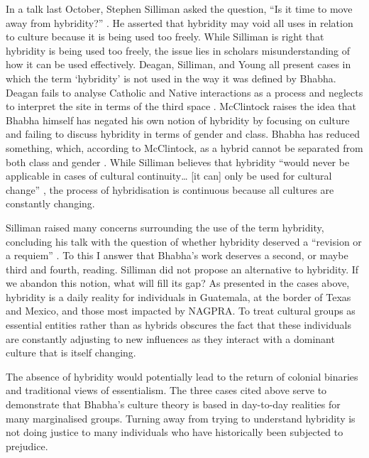 	In a talk last October, Stephen Silliman asked the question, “Is it time to move away from hybridity?” \parencite{Silliman_2014}. He asserted that hybridity may void all uses in relation to culture because it is being used too freely. While Silliman is right that hybridity is being used too freely, the issue lies in scholars misunderstanding of how it can be used effectively. Deagan, Silliman, and Young all present cases in which the term ‘hybridity’ is not used in the way it was defined by Bhabha. Deagan fails to analyse Catholic and Native interactions as a process and neglects to interpret the site in terms of the third space \parencite[267]{Deagan_2013}. McClintock raises the idea that Bhabha himself has negated his own notion of hybridity by focusing on culture and failing to discuss hybridity in terms of gender and class. Bhabha has reduced something, which, according to McClintock, as a hybrid cannot be separated from both class and gender \parencite[62]{McClintock_1995}. While Silliman believes that hybridity “would never be applicable in cases of cultural continuity… [it can] only be used for cultural change” \parencite[489]{Silliman_2013}, the process of hybridisation is continuous because all cultures are constantly changing. 

	Silliman raised many concerns surrounding the use of the term hybridity, concluding his talk with the question of whether hybridity deserved a “revision or a requiem” \parencite{Silliman_2014}. To this I answer that Bhabha’s work deserves a second, or maybe third and fourth, reading. Silliman did not propose an alternative to hybridity. If we abandon this notion, what will fill its gap? As presented in the cases above, hybridity is a daily reality for individuals in Guatemala, at the border of Texas and Mexico, and those most impacted by NAGPRA. To treat cultural groups as essential entities rather than as hybrids obscures the fact that these individuals are constantly adjusting to new influences as they interact with a dominant culture that is itself changing.

	The absence of hybridity would potentially lead to the return of colonial binaries and traditional views of essentialism. The three cases cited above serve to demonstrate that Bhabha’s culture theory is based in day-to-day realities for many marginalised groups. Turning away from trying to understand hybridity is not doing justice to many individuals who have historically been subjected to prejudice.
	

	
\printbibliography[heading=subbibnumbered] 
\label{Sheridan:lastpage}
\closingarticle

